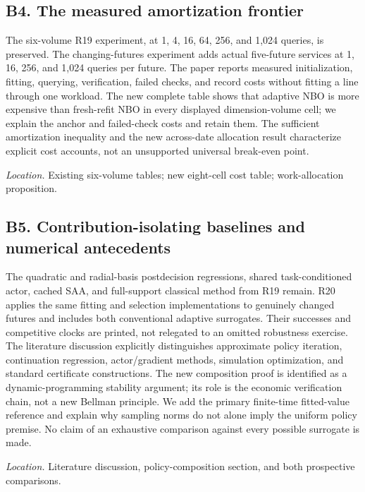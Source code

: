 \documentclass[ecta,nameyear,draft]{econsocart}
\theoremstyle{definition}
\theoremstyle{remark}
\begin{document}
\subsection*{B4. The measured amortization frontier}

The six-volume R19 experiment, at 1, 4, 16, 64, 256, and 1,024 queries, is preserved. The changing-futures experiment adds actual five-future services at 1, 16, 256, and 1,024 queries per future. The paper reports measured initialization, fitting, querying, verification, failed checks, and record costs without fitting a line through one workload. The new complete table shows that adaptive NBO is more expensive than fresh-refit NBO in every displayed dimension-volume cell; we explain the anchor and failed-check costs and retain them. The sufficient amortization inequality and the new across-date allocation result characterize explicit cost accounts, not an unsupported universal break-even point.


\par\smallskip\noindent\emph{Location.} Existing six-volume tables; new eight-cell cost table; work-allocation proposition.

\subsection*{B5. Contribution-isolating baselines and numerical antecedents}

The quadratic and radial-basis postdecision regressions, shared task-conditioned actor, cached SAA, and full-support classical method from R19 remain. R20 applies the same fitting and selection implementations to genuinely changed futures and includes both conventional adaptive surrogates. Their successes and competitive clocks are printed, not relegated to an omitted robustness exercise. The literature discussion explicitly distinguishes approximate policy iteration, continuation regression, actor/gradient methods, simulation optimization, and standard certificate constructions. The new composition proof is identified as a dynamic-programming stability argument; its role is the economic verification chain, not a new Bellman principle. We add the primary finite-time fitted-value reference and explain why sampling norms do not alone imply the uniform policy premise. No claim of an exhaustive comparison against every possible surrogate is made.


\par\smallskip\noindent\emph{Location.} Literature discussion, policy-composition section, and both prospective comparisons.
\end{document}
